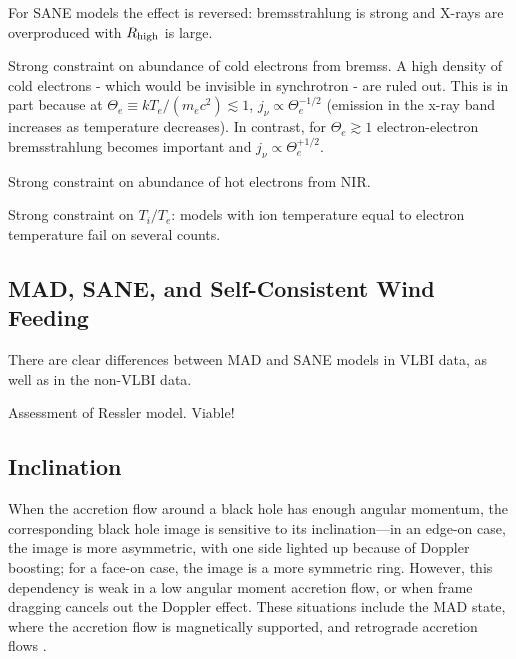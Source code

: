 For SANE models the effect is reversed: bremsstrahlung is strong and X-rays are overproduced with $R_\mathrm{high}$ is large.   


Strong constraint on abundance of cold electrons from bremss.  A high density of cold electrons - which would be invisible in synchrotron - are ruled out.  This is in part because at $\Theta_e \equiv k T_e/(m_e c^2) \lesssim 1$, $j_\nu \propto \Theta_e^{-1/2}$ (emission in the x-ray band increases as temperature decreases).  In contrast, for $\Theta_e \gtrsim 1$ electron-electron bremsstrahlung becomes important and $j_\nu \propto \Theta_e^{+1/2}$.

Strong constraint on abundance of hot electrons from NIR.

Strong constraint on $T_i/T_e$: models with ion temperature equal to electron temperature fail on several counts.


\subsection{MAD, SANE, and Self-Consistent Wind Feeding}


There are clear differences between MAD and SANE models in VLBI data, as well as in the non-VLBI data.

Assessment of Ressler model.  Viable!


\subsection{Inclination}


When the accretion flow around a black hole has enough angular momentum, the corresponding black hole image is sensitive to its inclination---in an edge-on case, the image is more asymmetric, with one side lighted up because of Doppler boosting; for a face-on case, the image is a more symmetric ring.
However, this dependency is weak in a low angular moment accretion flow, or when frame dragging cancels out the Doppler effect. These situations include the MAD state, where the accretion flow is magnetically supported, and retrograde accretion flows \citep{2021arXiv210503424M}.

